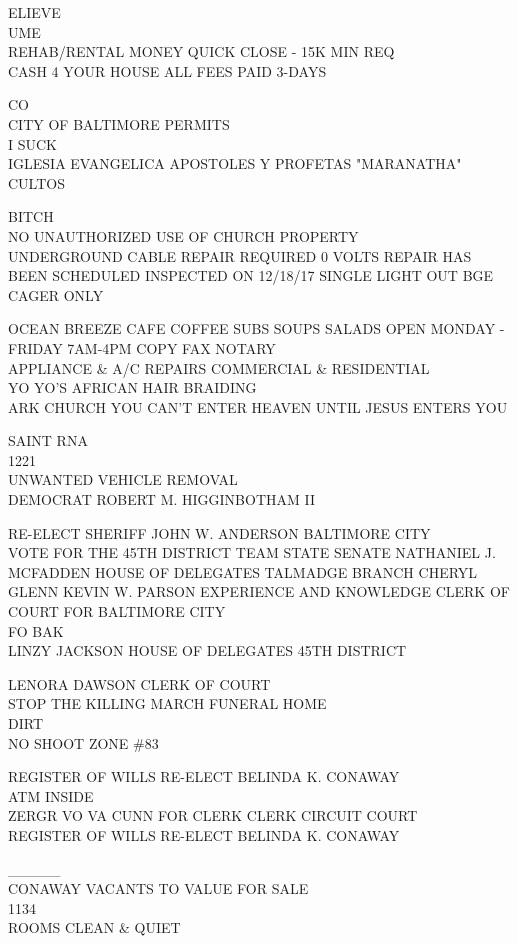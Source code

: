\documentclass[10pt,letterpaper]{article}
\begin{document}
ELIEVE\\
UME\\
REHAB/RENTAL MONEY QUICK CLOSE {-} 15K MIN REQ\\
CASH 4 YOUR HOUSE ALL FEES PAID 3{-}DAYS

CO\\
CITY OF BALTIMORE PERMITS\\
I SUCK\\
IGLESIA EVANGELICA APOSTOLES Y PROFETAS "MARANATHA" CULTOS

BITCH\\
NO UNAUTHORIZED USE OF CHURCH PROPERTY\\
UNDERGROUND CABLE REPAIR REQUIRED 0 VOLTS REPAIR HAS BEEN SCHEDULED INSPECTED ON 12/18/17 SINGLE LIGHT OUT BGE\\
CAGER ONLY

OCEAN BREEZE CAFE COFFEE SUBS SOUPS SALADS OPEN MONDAY {-} FRIDAY 7AM{-}4PM COPY FAX NOTARY\\
APPLIANCE \& A/C REPAIRS COMMERCIAL \& RESIDENTIAL\\
YO YO'S AFRICAN HAIR BRAIDING\\
ARK CHURCH YOU CAN'T ENTER HEAVEN UNTIL JESUS ENTERS YOU

SAINT RNA\\
1221\\
UNWANTED VEHICLE REMOVAL\\
DEMOCRAT ROBERT M. HIGGINBOTHAM II

RE{-}ELECT SHERIFF JOHN W. ANDERSON BALTIMORE CITY\\
VOTE FOR THE 45TH DISTRICT TEAM STATE SENATE NATHANIEL J. MCFADDEN HOUSE OF DELEGATES TALMADGE BRANCH CHERYL GLENN KEVIN W. PARSON EXPERIENCE AND KNOWLEDGE CLERK OF COURT FOR BALTIMORE CITY\\
FO BAK\\
LINZY JACKSON HOUSE OF DELEGATES 45TH DISTRICT

LENORA DAWSON CLERK OF COURT\\
STOP THE KILLING MARCH FUNERAL HOME\\
DIRT\\
NO SHOOT ZONE \#83

REGISTER OF WILLS RE{-}ELECT BELINDA K. CONAWAY\\
ATM INSIDE\\
ZERGR VO VA CUNN FOR CLERK CLERK CIRCUIT COURT\\
REGISTER OF WILLS RE{-}ELECT BELINDA K. CONAWAY

\_\_\_\_\_\\
CONAWAY VACANTS TO VALUE FOR SALE\\
1134\\
ROOMS CLEAN \& QUIET
\end{document}
